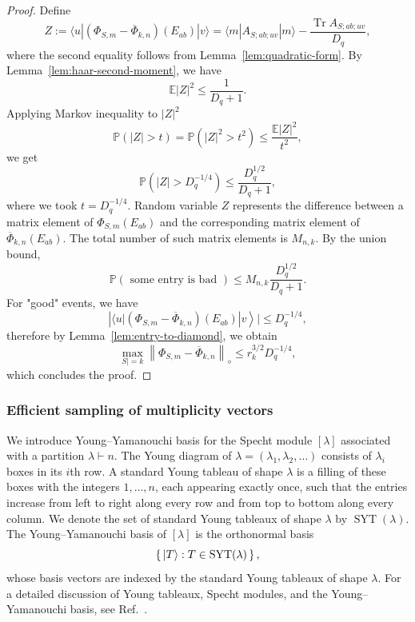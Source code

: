 \documentclass[11pt,letterpaper]{article}
\theoremstyle{plain}
\theoremstyle{plain}
\theoremstyle{plain}
\theoremstyle{plain}
\theoremstyle{plain}
\theoremstyle{plain}
\theoremstyle{plain}
\theoremstyle{definition}
\theoremstyle{plain}
\begin{document}
\begin{proof}
    Define
    \[
        Z:=\langle u|\left(\Phi_{S, m}-\overline{\Phi}_{k,n}\right)\left(E_{a b}\right)|v\rangle=\langle m| A_{S ; a b ; u v}|m\rangle-\frac{\operatorname{Tr} A_{S ; a b ; u v}}{D_q},
    \]
    where the second equality follows from Lemma~\ref{lem:quadratic-form}. By Lemma~\ref{lem:haar-second-moment}, we have
    \[
        \mathbb{E}|Z|^2 \leq \frac{1}{D_q+1}.
    \]
    Applying Markov inequality to $|Z|^2$
    \[
        \mathbb{P}(|Z|>t)=\mathbb{P}\left(|Z|^2>t^2\right) \leq \frac{\mathbb{E}|Z|^2}{t^2},
    \]
    we get
    \[
        \mathbb{P}(|Z|>D_q^{-1/4}) \leq \frac{D_q^{1/2}}{D_q+1},
    \]
    where we took $t=D_q^{-1/4}$. Random variable $Z$ represents the difference between a matrix element of $\Phi_{S, m}\left(E_{a b}\right)$ and the corresponding matrix element of $\overline{\Phi}_{k,n}\left(E_{a b}\right)$. 
    The total number of such matrix elements is $M_{n,k}$.  By the union bound,
    \[
    \mathbb{P}(\text { some entry is bad }) \leq M_{n, k} \frac{D_q^{1 / 2}}{D_q+1}.
    \]
    For "good" events, we have
    \[
    \left.\left|\langle u|\left(\Phi_{S, m}-\overline{\Phi}_{k,n}\right)\left(E_{a b}\right)\right| v\right\rangle \mid \leq D_q^{-1 / 4},
    \]
    therefore by Lemma~\ref{lem:entry-to-diamond}, we obtain
    \[
    \max _{S \mid=k}\left\|\Phi_{S, m}-\overline{\Phi}_{k,n}\right\|_{\diamond} \leq r_k^{3 / 2} D_q^{-1 / 4},
    \]
    which concludes the proof.
\end{proof}

\subsubsection{Efficient sampling of multiplicity vectors}\label{sec:efficient_sampling}

We introduce Young--Yamanouchi basis for the Specht module $[\lambda]$ associated with a partition $\lambda\vdash n$. 
The Young diagram of $\lambda=(\lambda_1,\lambda_2,\ldots)$ consists of $\lambda_i$ boxes in its $i$th row. 
A standard Young tableau of shape $\lambda$ is a filling of these boxes with the integers $1,\ldots,n$, each appearing exactly once, such that the entries increase from left to right along every row and from top to bottom along every column. 
We denote the set of standard Young tableaux of shape $\lambda$ by $\operatorname{SYT}(\lambda)$. 
The Young--Yamanouchi basis of $[\lambda]$ is the orthonormal basis
\[
    \left\{\,\ket{T}:T\in\operatorname{SYT}(\lambda)\,\right\},
\]
whose basis vectors are indexed by the standard Young tableaux of shape $\lambda$. 
For a detailed discussion of Young tableaux, Specht modules, and the Young--Yamanouchi basis, see Ref.~\cite{Sagan2001}.
\end{document}
